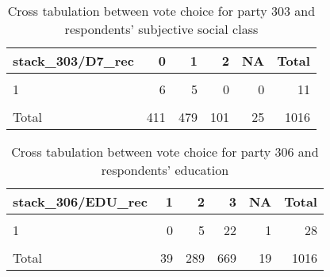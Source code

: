 \documentclass[
]{article}
\begin{document}
\begin{table}

\caption{\label{tab:unnamed-chunk-21}Cross tabulation between vote choice for party 303 and respondents' subjective social class
                   \label{table:crosstab_2_bg}}
\centering
\begin{tabular}[t]{l|r|r|r|r|r}
\hline
stack\_303/D7\_rec & 0 & 1 & 2 & NA & Total\\
\hline
\cellcolor{gray!6}{0} & \cellcolor{gray!6}{388} & \cellcolor{gray!6}{448} & \cellcolor{gray!6}{94} & \cellcolor{gray!6}{21} & \cellcolor{gray!6}{951}\\
\hline
1 & 6 & 5 & 0 & 0 & 11\\
\hline
\cellcolor{gray!6}{NA} & \cellcolor{gray!6}{17} & \cellcolor{gray!6}{26} & \cellcolor{gray!6}{7} & \cellcolor{gray!6}{4} & \cellcolor{gray!6}{54}\\
\hline
Total & 411 & 479 & 101 & 25 & 1016\\
\hline
\end{tabular}
\end{table}

\begin{table}

\caption{\label{tab:unnamed-chunk-21}Cross tabulation between vote choice for party 306 and respondents' education 
                   \label{table:crosstab_3_bg}}
\centering
\begin{tabular}[t]{l|r|r|r|r|r}
\hline
stack\_306/EDU\_rec & 1 & 2 & 3 & NA & Total\\
\hline
\cellcolor{gray!6}{0} & \cellcolor{gray!6}{37} & \cellcolor{gray!6}{268} & \cellcolor{gray!6}{611} & \cellcolor{gray!6}{18} & \cellcolor{gray!6}{934}\\
\hline
1 & 0 & 5 & 22 & 1 & 28\\
\hline
\cellcolor{gray!6}{NA} & \cellcolor{gray!6}{2} & \cellcolor{gray!6}{16} & \cellcolor{gray!6}{36} & \cellcolor{gray!6}{0} & \cellcolor{gray!6}{54}\\
\hline
Total & 39 & 289 & 669 & 19 & 1016\\
\hline
\end{tabular}
\end{table}
\end{document}
